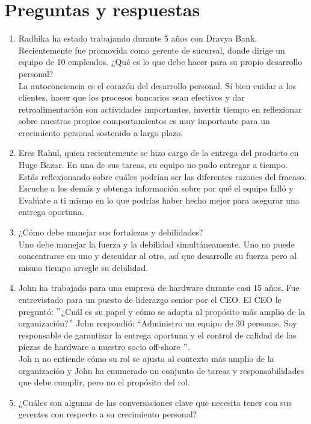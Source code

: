 \documentclass[10pt]{book}
\begin{document}
\section{Preguntas y respuestas}
\begin{enumerate}[\bfseries 1.]
\item Radhika ha estado trabajando durante 5 años con Dravya Bank. Recientemente fue promovida como gerente de sucursal, donde dirige un equipo de 10 empleados. ¿Qué es lo que debe hacer para su propio desarrollo personal?\\
La autoconciencia es el corazón del desarrollo personal. Si bien cuidar a los clientes, hacer que los procesos bancarios sean efectivos y dar retroalimentación son actividades importantes, invertir tiempo en reflexionar sobre nuestros propios comportamientos es muy importante para un crecimiento personal sostenido a largo plazo.
\item Eres Rahul, quien recientemente se hizo cargo de la entrega del producto en Huge Bazar. En una de sus tareas, su equipo no pudo entregar a tiempo. Estás reflexionando sobre cuáles podrían ser las diferentes razones del fracaso.\\
Escuche a los demás y obtenga información sobre por qué el equipo falló y Evalúate a ti mismo en lo que podrías haber hecho mejor para asegurar una entrega oportuna.
\item ¿Cómo debe manejar sus fortalezas y debilidades?\\
Uno debe manejar la fuerza y la debilidad simultáneamente. Uno no puede concentrarse en uno y descuidar al otro, así que desarrolle su fuerza pero al mismo tiempo arregle su debilidad.
\item John ha trabajado para una empresa de hardware durante casi 15 años. Fue entrevistado para un puesto de liderazgo senior por el CEO. El CEO le preguntó: $"$¿Cuál es su papel y cómo se adapta al propósito más amplio de la organización?$"$ John respondió: $“$Administro un equipo de 30 personas. Soy responsable de garantizar la entrega oportuna y el control de calidad de las piezas de hardware a nuestro socio off-shore $"$.\\
Joh n no entiende cómo su rol se ajusta al contexto más amplio de la organización y John ha enumerado un conjunto de tareas y responsabilidades que debe cumplir, pero no el propósito del rol.
\item ¿Cuáles son algunas de las conversaciones clave que necesita tener con sus gerentes con respecto a su crecimiento personal?\\

\end{enumerate}
\end{document}
